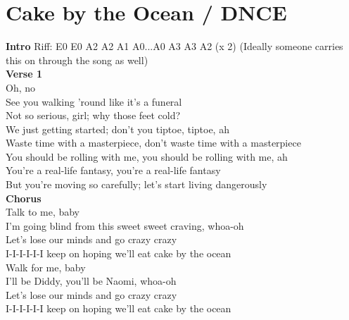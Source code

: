 \section{Cake by the Ocean / DNCE}\label{sec:cakebytheocean}

\Eminor
\Bminor
\Aminor
\Cmajor

\textbf{Intro} Riff: E0 E0 A2 A2 A1 A0...A0 A3 A3 A2 (x 2) (Ideally someone carries this on through the song as well)\\
\textbf{Verse 1}\\
Oh, no\\
See you walking 'round like it's a funeral\\
Not so serious, girl; why those feet cold?\\
We just getting started; don't you tiptoe, tiptoe, ah\\
Waste time with a masterpiece, don't waste time with a masterpiece\\
You should be rolling with me, you should be rolling with me, ah\\
You're a real-life fantasy, you're a real-life fantasy\\       
But you're moving so carefully; let's start living dangerously\\
\textbf{Chorus}\\
Talk to me, baby\\
I'm going blind from this sweet sweet craving, whoa-oh\\
Let's lose our minds and go crazy crazy\\
I-I-I-I-I-I keep on hoping we'll eat cake by the ocean\\
Walk for me, baby\\
I'll be Diddy,  you'll be Naomi, whoa-oh\\
Let's lose our minds and go crazy crazy\\
I-I-I-I-I-I keep on hoping we'll eat cake by the ocean\\

